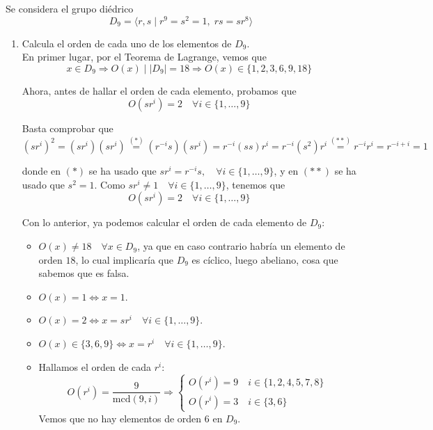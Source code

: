\documentclass[12pt]{article}
\begin{document}
    \begin{ejercicio}[3 puntos]
        Se considera el grupo diédrico $$D_9 = \langle r, s \mid r^9 = s^2 = 1,\; rs = sr^{8} \rangle$$

        \begin{enumerate}[label=(\alph*)]
            \item Calcula el orden de cada uno de los elementos de $D_9$. \\
            
            En primer lugar, por el Teorema de Lagrange, vemos que $$x \in D_9 \Longrightarrow O(x) \mid |D_9| = 18 \Longrightarrow O(x) \in \{1,2,3,6,9,18\}$$

            Ahora, antes de hallar el orden de cada elemento, probamos que $$O(sr^{i}) = 2 \quad \forall i \in \{1, \ldots, 9\}$$
            
            Basta comprobar que $$(sr^i)^2 = (sr^i)(sr^i) \stackrel{(*)}{=} (r^{-i}s)(sr^i) = r^{-i}(ss)r^i = r^{-i}(s^2)r^i \stackrel{(**)}{=} r^{-i}r^{i} = r^{-i+i} = 1$$

            donde en $(*)$ se ha usado que $sr^i = r^{-i}s, \quad \forall i \in \{1, \ldots, 9\}$, y en $(**)$ se ha usado que $s^2 = 1$. Como $sr^i \neq 1 \quad \forall i \in \{1, \ldots, 9\}$, tenemos que $$O(sr^i) = 2 \quad \forall i \in \{1, \ldots, 9\}$$

            Con lo anterior, ya podemos calcular el orden de cada elemento de $D_9$:

            \begin{itemize}
                \item $O(x) \neq 18 \quad \forall x \in D_9$, ya que en caso contrario habría un elemento de orden $18$, lo cual implicaría que $D_9$ es cíclico, luego abeliano, cosa que sabemos que es falsa.
                \item $O(x) = 1 \iff x = 1$.
                \item $O(x) = 2 \iff x = sr^i \quad \forall i \in \{1, \ldots, 9\}$.
                \item $O(x) \in \{3,6,9\} \iff x = r^i \quad \forall i \in \{1, \ldots, 9\}$.
                \item Hallamos el orden de cada $r^{i}$: $$O(r^i) = \dfrac{9}{\text{mcd}(9,i)} \Longrightarrow \begin{cases}
                    O(r^i) = 9 \quad i \in \{1,2,4,5,7,8\} \\
                    O(r^i) = 3 \quad i \in \{3,6\}
                \end{cases}$$
                Vemos que no hay elementos de orden $6$ en $D_9$.
            \end{itemize}


\end{enumerate}
\end{ejercicio}
\end{document}
